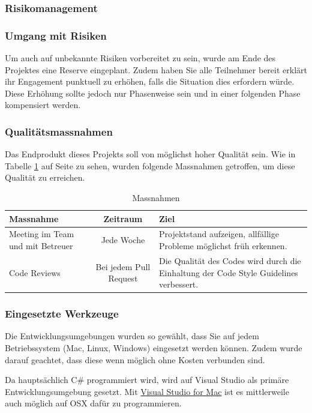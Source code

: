 \subsubsection*{Risikomanagement}

\subsubsection*{Umgang mit Risiken}
Um auch auf unbekannte Risiken vorbereitet zu sein, wurde am Ende des Projektes eine Reserve eingeplant. Zudem haben Sie alle Teilnehmer bereit erklärt ihr Engagement punktuell zu erhöhen, falls die Situation dies erfordern würde. Diese Erhöhung sollte jedoch nur Phasenweise sein und in einer folgenden Phase kompensiert werden.

\subsubsection*{Qualitätsmassnahmen}
Das Endprodukt dieses Projekts soll von möglichst hoher Qualität sein. Wie in Tabelle \ref{tab:Massnahmen} auf Seite \pageref{tab:Massnahmen} zu sehen, wurden folgende Massnahmen getroffen, um diese Qualität zu erreichen.

\renewcommand{\arraystretch}{2}
\begin{table}
  \begin{tabular}{ p{3cm} | c | p{5cm} }
    Massnahme			& Zeitraum	 	& Ziel \\
    \hline
    Meeting im Team und mit Betreuer & Jede Woche & Projektstand aufzeigen, allfällige Probleme möglichst früh erkennen.\\
    \hline
    Code Reviews & Bei jedem Pull Request & Die Qualität des Codes wird durch die Einhaltung der Code Style Guidelines verbessert.
  \end{tabular}
  \caption[Projektplan]{Massnahmen}
  \label{tab:Massnahmen}
\end{table}

\subsubsection*{Eingesetzte Werkzeuge}
Die Entwicklungsumgebungen wurden so gewählt, dass Sie auf jedem Betriebssystem (Mac, Linux, Windows) eingesetzt werden können. Zudem wurde darauf geachtet, dass diese wenn möglich ohne Kosten verbunden sind.

Da hauptsächlich C\# programmiert wird, wird auf Visual Studio als primäre Entwicklungsumgebung gesetzt. Mit \href{https://visualstudio.microsoft.com/de/vs/mac/}{Visual Studio for Mac} ist es mittlerweile auch möglich auf OSX dafür zu programmieren.


